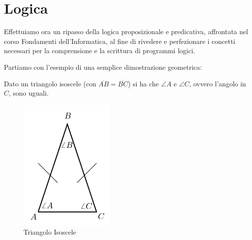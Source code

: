 \chapter{Logica}
Effettuiamo ora un ripasso della logica proposizionale e predicativa, affrontata nel corso Fondamenti
dell'Informatica, al fine di rivedere e perfezionare i concetti necessari
per la comprensione e la scrittura di programmi logici.

Partiamo con l'esempio di una semplice dimostrazione geometrica:
\begin{teorema}
  Dato un triangolo isoscele (con $\overline{AB}=\overline{BC}$) si ha che $\angle A$ e $\angle C$, ovvero l'angolo in $C$, sono uguali.
\begin{figure}
\caption{Triangolo Isoscele}
\includegraphics[scale=0.5]{img/tri.png}
\end{figure}
\end{teorema}
